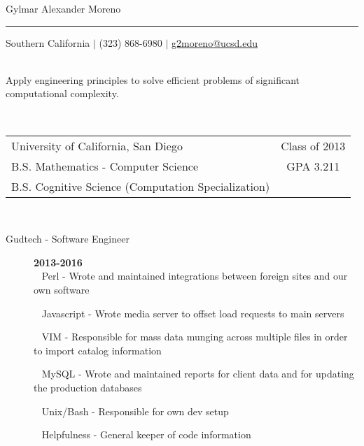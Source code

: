 \documentclass{article}
\begin{document}
\center
{
	\LARGE{Gylmar Alexander Moreno}
    \vspace{-.2cm}
}
\rule{8in}{.01cm}


	Southern California $\mid$ (323) 868-6980 $\mid$
\href{mailto:g2moreno@ucsd.edu}{g2moreno@ucsd.edu}
\begin{description}
    \vspace{-.1in}
    \item[\underline{OBJECTIVE}] \hfill \\
        Apply engineering principles to solve efficient problems 
        of significant computational complexity.

    \vspace{-.025in}
    \item[\underline{EDUCATION}]  \hfill \\
        \vspace{.03in}
        \begin{tabular}{l|c}
            \large{University of California, San Diego}& \hfill \large{Class of 2013}\\
                            B.S. Mathematics - Computer Science & \hfill \large{GPA 3.211}\\
			B.S. Cognitive Science (Computation Specialization)&\\
		\end{tabular}

    \item[\underline{WORK EXPERIENCE}] \hfill \\
		\begin{description}
            \item[Gudtech - Software Engineer] \hfill \textbf{2013-2016}\\
                \textbullet ~ Perl - Wrote and maintained integrations between foreign sites and our own software

                \textbullet ~ Javascript - Wrote media server to offset load requests to main servers

                \textbullet ~ VIM - Responsible for mass data munging across multiple files in order to import catalog information

                \textbullet ~ MySQL - Wrote and maintained reports for client data and for updating the production databases

                \textbullet ~ Unix/Bash - Responsible for own dev setup

                \textbullet ~ Helpfulness - General keeper of code information
		\end{description}



\end{description}
\end{document}
